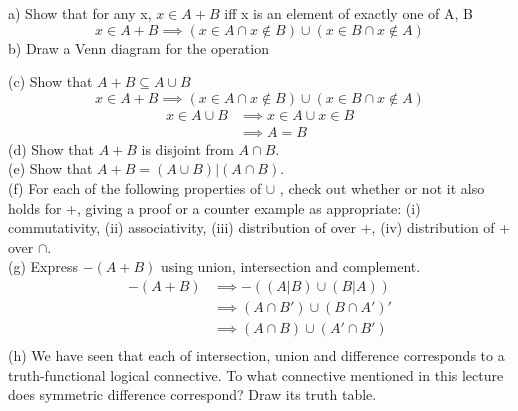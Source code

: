 \documentclass{article}
\begin{document}
a) Show that for any x, $x \in A + B$ iff x is an element of exactly one of A, B
\begin{equation*}
    x \in A + B \implies (x \in A \cap x \notin B) \cup (x \in B \cap x \notin A)
\end{equation*}
b) Draw a Venn diagram for the operation\\
\begin{center}
\end{center}
(c) Show that $A+B \subseteq A \cup B$ \\
\begin{equation*}
    x \in A+B \implies (x \in A \cap x \notin B) \cup (x \in B \cap x \notin A)
\end{equation*}
\begin{align*}
    x \in A \cup B &\implies x \in A \cup x \in B\\
                   &\implies A = B
\end{align*}
(d) Show that $A+B$ is disjoint from $A \cap B$.\\
(e) Show that $A+B = (A \cup B)|(A \cap B)$.\\
(f) For each of the following properties of $\cup$ , check out whether or not it also holds for +, giving a proof or a counter example as appropriate: (i) commutativity, (ii) associativity, (iii) distribution of over +, (iv) distribution of + over $\cap$.\\
(g) Express $-(A+B)$ using union, intersection and complement.\\
\begin{align*}
    -(A+B) &\implies -((A|B) \cup (B|A))\\
           &\implies (A \cap B') \cup (B \cap A')'\\
           &\implies (A \cap B) \cup (A' \cap B')\\
\end{align*}
(h) We have seen that each of intersection, union and difference corresponds to a truth-functional logical connective. To what connective mentioned in this lecture does symmetric difference correspond? Draw its truth table.
\end{document}

